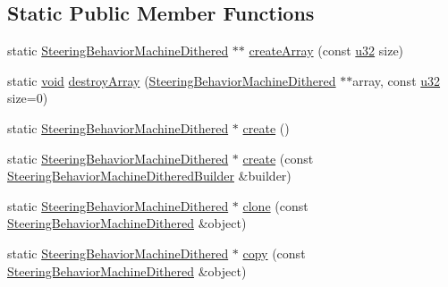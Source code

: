 \subsection*{Static Public Member Functions}
\begin{DoxyCompactItemize}
\item 
static \mbox{\hyperlink{classnjli_1_1_steering_behavior_machine_dithered}{Steering\+Behavior\+Machine\+Dithered}} $\ast$$\ast$ \mbox{\hyperlink{classnjli_1_1_steering_behavior_machine_dithered_a42e026ffce4751ecc02a859067698190}{create\+Array}} (const \mbox{\hyperlink{_util_8h_a10e94b422ef0c20dcdec20d31a1f5049}{u32}} size)
\item 
static \mbox{\hyperlink{_thread_8h_af1e856da2e658414cb2456cb6f7ebc66}{void}} \mbox{\hyperlink{classnjli_1_1_steering_behavior_machine_dithered_a8b50147d7efe72e24c8508272db0ec16}{destroy\+Array}} (\mbox{\hyperlink{classnjli_1_1_steering_behavior_machine_dithered}{Steering\+Behavior\+Machine\+Dithered}} $\ast$$\ast$array, const \mbox{\hyperlink{_util_8h_a10e94b422ef0c20dcdec20d31a1f5049}{u32}} size=0)
\item 
static \mbox{\hyperlink{classnjli_1_1_steering_behavior_machine_dithered}{Steering\+Behavior\+Machine\+Dithered}} $\ast$ \mbox{\hyperlink{classnjli_1_1_steering_behavior_machine_dithered_a114f4f4f9fd40f9470450091d7b05a08}{create}} ()
\item 
static \mbox{\hyperlink{classnjli_1_1_steering_behavior_machine_dithered}{Steering\+Behavior\+Machine\+Dithered}} $\ast$ \mbox{\hyperlink{classnjli_1_1_steering_behavior_machine_dithered_a033a7447b22988087a4b6c97f9421d6f}{create}} (const \mbox{\hyperlink{classnjli_1_1_steering_behavior_machine_dithered_builder}{Steering\+Behavior\+Machine\+Dithered\+Builder}} \&builder)
\item 
static \mbox{\hyperlink{classnjli_1_1_steering_behavior_machine_dithered}{Steering\+Behavior\+Machine\+Dithered}} $\ast$ \mbox{\hyperlink{classnjli_1_1_steering_behavior_machine_dithered_ae37b36577ae4e6649fe03dc38ba8cda8}{clone}} (const \mbox{\hyperlink{classnjli_1_1_steering_behavior_machine_dithered}{Steering\+Behavior\+Machine\+Dithered}} \&object)
\item 
static \mbox{\hyperlink{classnjli_1_1_steering_behavior_machine_dithered}{Steering\+Behavior\+Machine\+Dithered}} $\ast$ \mbox{\hyperlink{classnjli_1_1_steering_behavior_machine_dithered_a67fd94a3edce2e3f8b0aa18fc918333b}{copy}} (const \mbox{\hyperlink{classnjli_1_1_steering_behavior_machine_dithered}{Steering\+Behavior\+Machine\+Dithered}} \&object)
\item 

\end{DoxyCompactItemize}

